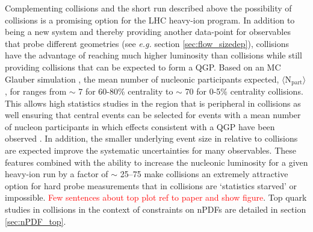 \documentclass[../report.tex]{subfiles}
\begin{document}
Complementing \PbPb collisions and the short \OO run described above the possibility of \ArAr collisions is a promising option for the LHC heavy-ion program.  In addition to being a new system and thereby providing another data-point for observables that probe different geometries (see \textit{e.g.} section \ref{sec:flow_sizedep}), \ArAr collisions have the advantage of reaching much higher luminosity than \PbPb collisions while still providing collisions that can be expected to form a QGP.  Based on an MC Glauber simulation \cite{Miller:2007ri}, the mean number of nucleonic participants expected, $\langle \mathrm{N_{part}}\rangle$, for \ArAr ranges from  $\sim$ 7 for 60-80\% centrality to $\sim$ 70 for 0-5\% centrality collisions.  This allows high statistics studies in the region that is peripheral in \PbPb collisions as well ensuring that central events can be selected for events with a mean number of nucleon participants in which effects consistent with a QGP have been observed \cite{Sirunyan:2018eqi, ATLAS-CONF-2018-007}.  In addition, the smaller underlying event size in \ArAr relative to \PbPb collisions are expected improve the systematic uncertainties for many observables.  These features combined with the ability to increase the nucleonic luminosity for a given heavy-ion run by a factor of $\sim$ 25--75 make \ArAr collisions an extremely attractive option for hard probe measurements that in \PbPb collisions are `statistics starved' or impossible.  
\textcolor{red}{Few sentences about top plot ref to paper and show figure}.  Top quark studies in \ArAr collisions in the context of constraints on nPDFs are detailed in section \ref{sec:nPDF_top}.
\end{document}
